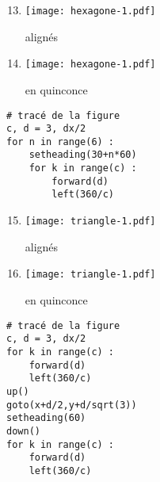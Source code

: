 \documentclass[11pt,a4paper]{article}
\begin{document}
\noindent\begin{minipage}[t]{5cm}
\begin{enumerate}\setcounter{enumi}{12}
\item \begin{minipage}{1.75cm}\texttt{[image: hexagone-1.pdf]}\end{minipage} alignés
\item \begin{minipage}{1.75cm}\texttt{[image: hexagone-1.pdf]}\end{minipage} en quinconce
\end{enumerate}
\end{minipage}
\hfill
\begin{minipage}[t]{7cm}\footnotesize
\begin{Verbatim}
# tracé de la figure
c, d = 3, dx/2
for n in range(6) :
    setheading(30+n*60)
    for k in range(c) :
        forward(d)
        left(360/c)
\end{Verbatim}
\end{minipage}
\vspace*{5mm}

\newpage
\noindent\begin{minipage}[t]{5cm}
\begin{enumerate}\setcounter{enumi}{14}
\item \begin{minipage}{1.75cm}\texttt{[image: triangle-1.pdf]}\end{minipage} alignés
\item \begin{minipage}{1.75cm}\texttt{[image: triangle-1.pdf]}\end{minipage} en quinconce
\end{enumerate}
\end{minipage}
\hfill
\begin{minipage}[t]{7cm}\footnotesize
\begin{Verbatim}
# tracé de la figure
c, d = 3, dx/2
for k in range(c) :
    forward(d)
    left(360/c)
up()
goto(x+d/2,y+d/sqrt(3))
setheading(60)
down()
for k in range(c) :
    forward(d)
    left(360/c)
\end{Verbatim}
\end{minipage}
\vspace*{5mm}
\end{document}
